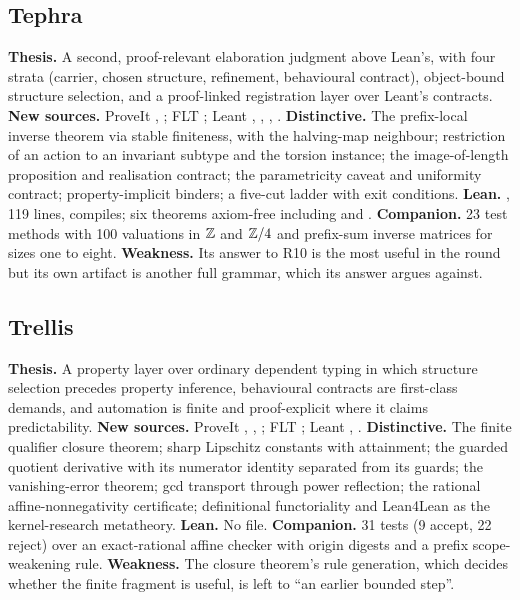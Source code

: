 \subsection*{Tephra}
\textbf{Thesis.} A second, proof-relevant elaboration judgment above Lean's, with four strata (carrier, chosen structure, refinement, behavioural contract), object-bound structure selection, and a proof-linked registration layer over Leant's contracts. \textbf{New sources.} ProveIt , ; FLT ; Leant , , , . \textbf{Distinctive.} The prefix-local inverse theorem via stable finiteness, with the halving-map neighbour; restriction of an action to an invariant subtype and the torsion instance; the image-of-length proposition and realisation contract; the parametricity caveat and uniformity contract; property-implicit binders; a five-cut ladder with exit conditions. \textbf{Lean.} , 119 lines, compiles; six theorems axiom-free including  and . \textbf{Companion.} 23 test methods with 100 valuations in $\mathbb Z$ and $\mathbb Z/4$ and prefix-sum inverse matrices for sizes one to eight. \textbf{Weakness.} Its answer to R10 is the most useful in the round but its own artifact is another full grammar, which its answer argues against.

\subsection*{Trellis}
\textbf{Thesis.} A property layer over ordinary dependent typing in which structure selection precedes property inference, behavioural contracts are first-class demands, and automation is finite and proof-explicit where it claims predictability. \textbf{New sources.} ProveIt , , ; FLT ; Leant , . \textbf{Distinctive.} The finite qualifier closure theorem; sharp Lipschitz constants with attainment; the guarded quotient derivative with its numerator identity separated from its guards; the vanishing-error theorem; gcd transport through power reflection; the rational affine-nonnegativity certificate; definitional functoriality and Lean4Lean as the kernel-research metatheory. \textbf{Lean.} No file. \textbf{Companion.} 31 tests (9 accept, 22 reject) over an exact-rational affine checker with origin digests and a prefix scope-weakening rule. \textbf{Weakness.} The closure theorem's rule generation, which decides whether the finite fragment is useful, is left to ``an earlier bounded step''.

